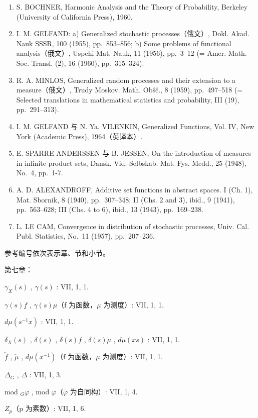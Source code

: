 \begin{enumerate}
\item
  S. BOCHNER, Harmonic Analysis and the Theory of Probability, Berkeley (University of California Press), 1960.
\item
  I. M. GELFAND: a) Generalized stochastic processes（俄文）, Dokl. Akad. Nauk SSSR, 100 (1955), pp.~853--856; b) Some problems of functional analysis（俄文）, Uspehi Mat. Nauk, 11 (1956), pp.~3--12 (= Amer. Math. Soc. Transl. (2), 16 (1960), pp.~315--324).
\item
  R. A. MINLOS, Generalized random processes and their extension to a measure（俄文）, Trudy Moskov. Math. Obšč., 8 (1959), pp.~497--518 (= Selected translations in mathematical statistics and probability, III (19), pp.~291--313).
\item
  I. M. GELFAND 与 N. Ya. VILENKIN, Generalized Functions, Vol. IV, New York (Academic Press), 1964（英译本）.
\item
  E. SPARRE-ANDERSSEN 与 B. JESSEN, On the introduction of measures in infinite product sets, Dansk. Vid. Selbskab. Mat. Fys. Medd., 25 (1948), No.~4, pp.~1-7.
\item
  A. D. ALEXANDROFF, Additive set functions in abstract spaces. I (Ch. 1), Mat. Sbornik, 8 (1940), pp.~307--348; II (Chs. 2 and 3), ibid., 9 (1941), pp.~563--628; III (Chs. 4 to 6), ibid., 13 (1943), pp.~169--238.
\item
  L. LE CAM, Convergence in distribution of stochastic processes, Univ. Cal. Publ. Statistics, No.~11 (1957), pp.~207--236.
\end{enumerate}


参考编号依次表示章、节和小节。

第七章：

\(\gamma_{X}(s)\) , \(\gamma(s)\) : VII, 1, 1.

\(\gamma(s)f\) , \(\gamma(s)\mu\)（f 为函数，\(\mu\) 为测度）: VII, 1, 1.

\(d\mu(s^{-1}x)\) : VII, 1, 1.

\(\delta_{X}(s)\) , \(\delta(s)\) , \(\delta(s)f\) , \(\delta(s)\mu\) , \(d\mu(xs)\) : VII, 1, 1.

\(\check{f}\) , \(\check{\mu}\) , \(d\mu(x^{-1})\)（f 为函数，\(\mu\) 为测度）: VII, 1, 1.

\(\Delta_{G}\) , \(\Delta\) : VII, 1, 3.

mod \(_{G}\varphi\) , mod \(\varphi\)（\(\varphi\) 为自同构）: VII, 1, 4.

\(Z_{p}\)（p 为素数）: VII, 1, 6.

